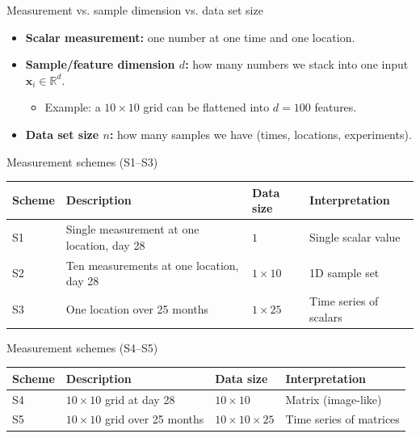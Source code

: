 \documentclass[12pt]{beamer}
\begin{document}
\begin{frame}{Measurement vs. sample dimension vs. data set size}
  \begin{itemize}
    \item \textbf{Scalar measurement:} one number at one time and one location.
    \item \textbf{Sample/feature dimension $d$:} how many numbers we stack into one input $\bm{x}_i \in \mathbb{R}^d$.
      \begin{itemize}
        \item Example: a $10\times 10$ grid can be flattened into $d=100$ features.
      \end{itemize}
    \item \textbf{Data set size $n$:} how many samples we have (times, locations, experiments).
  \end{itemize}
\end{frame}

\begin{frame}{Measurement schemes (S1--S3)}
  \scriptsize
  \renewcommand{\arraystretch}{1.2}
  \setlength{\tabcolsep}{3pt}
  \begin{tabular}{|p{1.2cm}|p{2.2cm}|p{2.2cm}|p{}|}
    \hline
    Scheme & Description & Data size & Interpretation \\
    \hline
    S1 & Single measurement at one location, day 28 & $1$ & Single scalar value \\ \hline
    S2 & Ten measurements at one location, day 28 & $1 \times 10$ & 1D sample set \\ \hline
    S3 & One location over 25 months & $1 \times 25$ & Time series of scalars \\
    \hline
  \end{tabular}
\end{frame}

\begin{frame}{Measurement schemes (S4--S5)}
  \scriptsize
  \renewcommand{\arraystretch}{1.2}
  \setlength{\tabcolsep}{3pt}
  \begin{tabular}{|p{1.2cm}|p{3.2cm}|p{2.0cm}|p{}|}
    \hline
    Scheme & Description & Data size & Interpretation \\
    \hline
    S4 & $10 \times 10$ grid at day 28 & $10 \times 10$ & Matrix (image-like) \\ \hline
    S5 & $10 \times 10$ grid over 25 months & $10 \times 10 \times 25$ & Time series of matrices \\
    \hline
  \end{tabular}
\end{frame}
\end{document}
